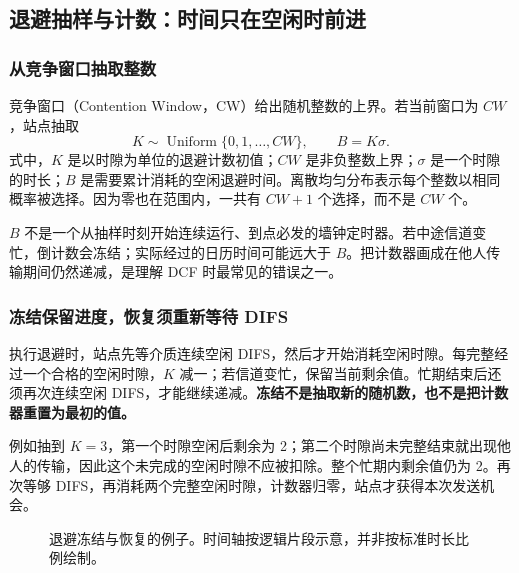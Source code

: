 \subsection{退避抽样与计数：时间只在空闲时前进}

\subsubsection{从竞争窗口抽取整数}

竞争窗口（Contention Window，CW）给出随机整数的上界。若当前窗口为 $CW$，站点抽取
\begin{equation}
K\sim\operatorname{Uniform}\{0,1,\ldots,CW\},\qquad B=K\sigma.
\label{eq:backoff-draw}
\end{equation}
式中，$K$ 是以时隙为单位的退避计数初值；$CW$ 是非负整数上界；$\sigma$ 是一个时隙的时长；$B$ 是需要累计消耗的空闲退避时间。离散均匀分布表示每个整数以相同概率被选择。因为零也在范围内，一共有 $CW+1$ 个选择，而不是 $CW$ 个。

$B$ 不是一个从抽样时刻开始连续运行、到点必发的墙钟定时器。若中途信道变忙，倒计数会冻结；实际经过的日历时间可能远大于 $B$。把计数器画成在他人传输期间仍然递减，是理解 DCF 时最常见的错误之一。

\subsubsection{冻结保留进度，恢复须重新等待 DIFS}

执行退避时，站点先等介质连续空闲 DIFS，然后才开始消耗空闲时隙。每完整经过一个合格的空闲时隙，$K$ 减一；若信道变忙，保留当前剩余值。忙期结束后还须再次连续空闲 DIFS，才能继续递减。\textbf{冻结不是抽取新的随机数，也不是把计数器重置为最初的值。}

例如抽到 $K=3$，第一个时隙空闲后剩余为 2；第二个时隙尚未完整结束就出现他人的传输，因此这个未完成的空闲时隙不应被扣除。整个忙期内剩余值仍为 2。再次等够 DIFS，再消耗两个完整空闲时隙，计数器归零，站点才获得本次发送机会。

\begin{figure}[htbp]
\centering
{}
\caption{退避冻结与恢复的例子。时间轴按逻辑片段示意，并非按标准时长比例绘制。}
\label{fig:backoff-freeze}
\end{figure}

